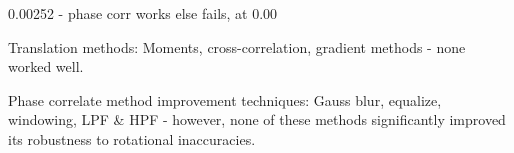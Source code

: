 0.00252 - phase corr works else fails, at 0.00


Translation methods: Moments, cross-correlation, gradient methods - none worked well.

Phase correlate method improvement techniques: Gauss blur, equalize, windowing, LPF \& HPF - however, none of these methods significantly improved its robustness to rotational inaccuracies.